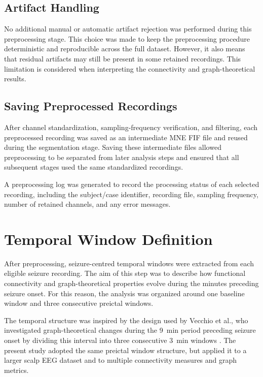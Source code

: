 \subsection{Artifact Handling}
\label{subsec:artifact-handling}

No additional manual or automatic artifact rejection was performed during this
preprocessing stage. This choice was made to keep the preprocessing procedure deterministic and
reproducible across the full dataset. However, it also means that residual
artifacts may still be present in some retained recordings. This limitation is
considered when interpreting the connectivity and graph-theoretical results.

\subsection{Saving Preprocessed Recordings}
\label{subsec:saving-preprocessed-recordings}

After channel standardization, sampling-frequency verification, and filtering,
each preprocessed recording was saved as an intermediate MNE FIF file
and reused during the segmentation stage. Saving these intermediate files
allowed preprocessing to be separated from later analysis steps and ensured that
all subsequent stages used the same standardized recordings.

A preprocessing log was generated to record the processing status of each
selected recording, including the subject/case identifier, recording file,
sampling frequency, number of retained channels, and any error messages.

\section{Temporal Window Definition}
\label{sec:temporal-window-definition}

After preprocessing, seizure-centred temporal windows were extracted from each
eligible seizure recording. The aim of this step was to describe how functional
connectivity and graph-theoretical properties evolve during the minutes
preceding seizure onset. For this reason, the analysis was organized around one
baseline window and three consecutive preictal windows.

The temporal structure was inspired by the design used by Vecchio et al.,
who investigated graph-theoretical changes during the \SI{9}{\minute} period
preceding seizure onset by dividing this interval into three consecutive
\SI{3}{\minute} windows \cite{Vecchio2016}. The present study adopted the same
preictal window structure, but applied it to a larger scalp EEG dataset and to
multiple connectivity measures and graph metrics.


